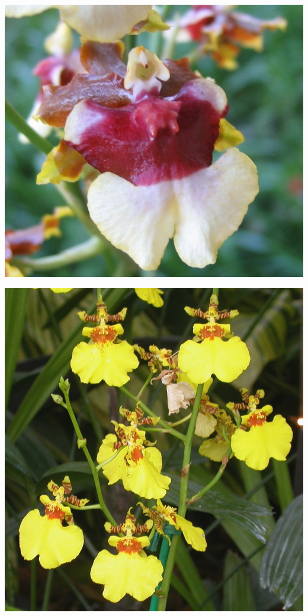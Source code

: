 \documentclass{article}
\begin{document}
\begin{center}
\includegraphics[height=0.925\paperheight]{../Orchid_Oncidium.jpg}
\end{center}
\newpage

\begin{center}
\includegraphics[height=0.925\paperheight]{../Orchid_Oncidium2.jpg}
\end{center}
\newpage
\end{document}
